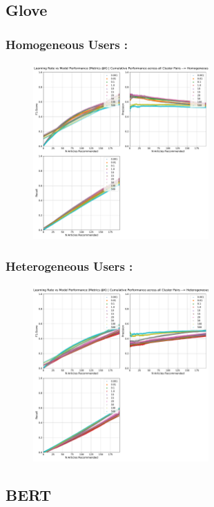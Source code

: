 \documentclass[a4paper,fontsize=8.0pt]{scrartcl}
\begin{document}
\subsection{Glove}
\subsubsection{Homogeneous Users :}
\begin{figure}[H]
 \includegraphics[width=0.6\textwidth]{Graphs/GLOVE/lr_vs_model_performance_cumu_Homogeneous.pdf}
\end{figure}
\subsubsection{Heterogeneous Users :}
\begin{figure}[H]
 \includegraphics[width=0.6\textwidth]{Graphs/GLOVE/lr_vs_model_performance_cumu_Heterogeneous.pdf}
\end{figure}
\subsection{BERT}
\end{document}
